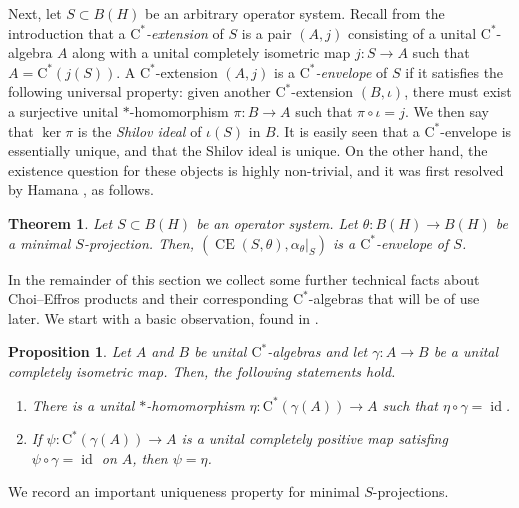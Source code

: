 \documentclass[10pt]{amsart}
\newcommand{\rC}{\mathrm{C}}
\newcommand{\eps}{\varepsilon}
\newcommand{\CE}{\operatorname{CE}}
\newcommand{\id}{\operatorname{id}}
\newtheorem{theorem}[lemma]{Theorem}
\newtheorem{proposition}[lemma]{Proposition}
\theoremstyle{definition}
\begin{document}
Next, let $S\subset B(H)$ be an arbitrary operator system. Recall from the introduction that a \emph{$\rC^*$-extension} of $S$ is a pair $(A,j)$ consisting of a unital $\rC^*$-algebra $A$ along with a unital completely isometric map $j:S\to A$ such that $A=\rC^*(j(S))$. A $\rC^*$-extension $(A,j)$ is a \emph{$\rC^*$-envelope} of $S$ if it satisfies the following universal property: given another $\rC^*$-extension $(B,\iota)$, there must exist a surjective unital $*$-homomorphism $\pi:B\to A$ such that $\pi\circ \iota=j$.  We then say that $\ker\pi$ is the \emph{Shilov ideal} of $\iota(S)$ in $B$. It is easily seen that a $\rC^*$-envelope is essentially unique, and that the Shilov ideal is unique.
On the other hand, the existence question for these objects is highly non-trivial, and it was first resolved by Hamana  \cite[Theorem 4.1]{hamana1979}, as follows.


\begin{theorem}\label{T:Cstarenv}
Let $S\subset B(H)$ be an operator system. Let $\theta:B(H)\to B(H)$ be a minimal $S$-projection. Then, $(\CE(S,\theta),\alpha_\theta|_S)$ is a $\rC^*$-envelope of $S$.
\end{theorem}


In the remainder of this section we collect some further technical facts about Choi--Effros products and their corresponding $\rC^*$-algebras that will be of use later.
We start with a basic observation, found in \cite[Theorem 4.1]{CE1976}.

\begin{proposition}\label{P:CEtrik}
Let $A$ and $B$ be unital $\rC^*$-algebras and let $\gamma:A\to B$ be a unital completely isometric map. Then, the following statements hold.
\begin{enumerate}[{\rm (i)}]
\item There is a unital $*$-homomorphism $\eta:\rC^*(\gamma(A))\to A$ such that $\eta\circ \gamma=\id$.
\item If  $\psi:\rC^*(\gamma(A))\to A$ is a unital completely positive map satisfing $\psi\circ \gamma=\id$ on $A$, then $\psi=\eta$. 
\end{enumerate} 
\end{proposition}


We record an important uniqueness property for minimal $S$-projections.
\end{document}
